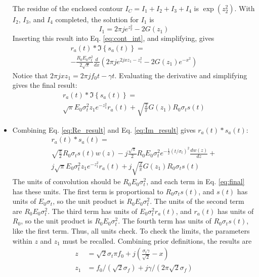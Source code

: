\documentclass[amsmath,amssymb,aps,prd,10pt,twocolumn,showkeys]{revtex4}
\begin{document}
\begin{itemize}
\begin{equation}
\end{equation}
The residue of the enclosed contour $I_C = I_1+I_2+I_3+I_4$ is $\exp(z_2^2)$.  With $I_2$, $I_3$, and $I_4$ completed, the solution for $I_1$ is
\begin{equation}
I_1 = 2\pi j e^{z_2^2} - 2G(z_1)
\end{equation}
Inserting this result into Eq. \ref{eq:cont_int}, and simplifying, gives
\begin{multline}
r_a(t) * \Im\left\lbrace s_a(t) \right\rbrace = \\
-\frac{R_0E_0\sigma_t^2}{2\sqrt{\pi}}\frac{d}{dx}\left( 2\pi j e^{2 j x z_1 - z_1^2} - 2G(z_1) e^{-x^2} \right)
\end{multline}
Notice that $2\pi j x z_1 = 2\pi j f_0 t - \gamma t$.  Evaluating the derivative and simplifying gives the final result:
\begin{multline}
r_a(t) * \Im\left\lbrace s_a(t) \right\rbrace = \\
\sqrt{\pi}E_0 \sigma_t^2 z_1 e^{-z_1^2}r_a(t) + \sqrt{\frac{2}{\pi}} G(z_1) R_0 \sigma_t s(t) \label{eq:Im_result}
\end{multline}
\item Combining Eq. \ref{eq:Re_result} and Eq. \ref{eq:Im_result} gives $r_a(t) * s_a(t)$:
\begin{multline}
r_a(t) * s_a(t) = \\
\sqrt{\frac{\pi}{2}}R_0 \sigma_t s(t) w(z) - j\frac{\sqrt{\pi}}{2} R_0 E_0 \sigma_t^2 e^{-\frac{1}{2}(t/\sigma_t)^2} \frac{dw(z)}{dz} + \\
j\sqrt{\pi}E_0 \sigma_t^2 z_1 e^{-z_1^2}r_a(t) + j\sqrt{\frac{2}{\pi}} G(z_1) R_0 \sigma_t s(t) \label{eq:final}
\end{multline}
The units of convolution should be $R_0 E_0\sigma_t^2$, and each term in Eq. \ref{eq:final} has these units.  The first term is proportional to $R_0 \sigma_t s(t)$, and $s(t)$ has units of $E_0 \sigma_t$, so the unit product is $R_0 E_0\sigma_t^2$.  The units of the second term are $R_0 E_0\sigma_t^2$.  The third term has units of $E_0\sigma_t^2 r_a(t)$, and $r_a(t)$ has units of $R_0$, so the unit product is $R_0 E_0\sigma_t^2$.  The fourth term has units of $R_0 \sigma_t s(t)$, like the first term.  Thus, all units check.  To check the limits, the parameters within $z$ and $z_1$ must be recalled.  Combining prior definitions, the results are
\begin{align}
z &= \sqrt{2}\sigma_t \pi f_0 + j\left(\frac{\sigma_t\gamma}{\sqrt{2}} - x\right) \\
z_1 &= f_0/(\sqrt{2}\sigma_f) + j\gamma/(2\pi \sqrt{2} \sigma_f)

\end{align}
\end{itemize}
\end{document}
